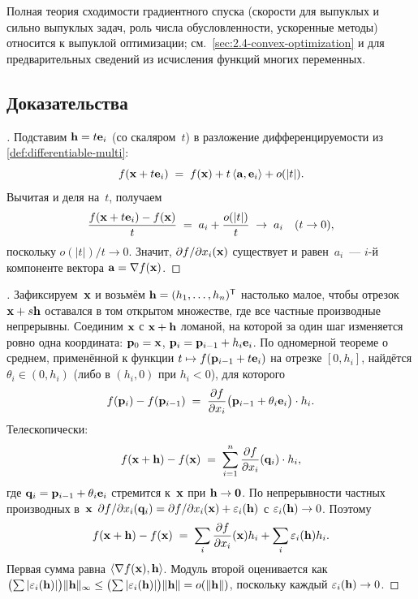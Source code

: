 \begin{remark}
Полная теория сходимости градиентного спуска (скорости для выпуклых и
сильно выпуклых задач, роль числа обусловленности, ускоренные методы)
относится к выпуклой оптимизации; см.\ \cref{sec:2.4-convex-optimization}
и \cite{Zorich1981} для предварительных сведений из исчисления
функций многих переменных.
\end{remark}

\subsection*{Доказательства}

\begin{proof}[]
Подставим $\mathbf{h} = t \mathbf{e}_i$ (со скаляром~$t$) в разложение
дифференцируемости из \cref{def:differentiable-multi}:
\[
  f(\mathbf{x} + t\mathbf{e}_i) \;=\; f(\mathbf{x}) + t\, \langle \mathbf{a}, \mathbf{e}_i \rangle + o(|t|).
\]
Вычитая и деля на~$t$, получаем
\[
  \frac{f(\mathbf{x} + t\mathbf{e}_i) - f(\mathbf{x})}{t} \;=\; a_i + \frac{o(|t|)}{t} \;\to\; a_i \quad (t \to 0),
\]
поскольку $o(|t|)/t \to 0$. Значит, $\partial f / \partial x_i (\mathbf{x})$
существует и равен~$a_i$~--- $i$-й компоненте вектора
$\mathbf{a} = \nabla f(\mathbf{x})$.
\end{proof}

\begin{proof}[]
Зафиксируем~$\mathbf{x}$ и возьмём $\mathbf{h} = (h_1, \dots, h_n)^{\mathsf{T}}$
настолько малое, чтобы отрезок $\mathbf{x} + s\mathbf{h}$ оставался в том
открытом множестве, где все частные производные непрерывны. Соединим
$\mathbf{x}$ с $\mathbf{x} + \mathbf{h}$ ломаной, на которой за один шаг
изменяется ровно одна координата:
$\mathbf{p}_0 = \mathbf{x}$, $\mathbf{p}_i = \mathbf{p}_{i-1} + h_i \mathbf{e}_i$.
По одномерной теореме о среднем, применённой к функции
$t \mapsto f(\mathbf{p}_{i-1} + t \mathbf{e}_i)$ на отрезке $[0, h_i]$,
найдётся $\theta_i \in (0, h_i)$ (либо в $(h_i, 0)$ при $h_i < 0$),
для которого
\[
  f(\mathbf{p}_i) - f(\mathbf{p}_{i-1}) \;=\; \frac{\partial f}{\partial x_i}\bigl(\mathbf{p}_{i-1} + \theta_i \mathbf{e}_i\bigr) \cdot h_i.
\]
Телескопически:
\[
  f(\mathbf{x} + \mathbf{h}) - f(\mathbf{x}) \;=\; \sum_{i=1}^{n} \frac{\partial f}{\partial x_i}(\mathbf{q}_i) \cdot h_i,
\]
где $\mathbf{q}_i = \mathbf{p}_{i-1} + \theta_i \mathbf{e}_i$ стремится
к~$\mathbf{x}$ при $\mathbf{h} \to \mathbf{0}$. По непрерывности частных
производных в~$\mathbf{x}$
$\partial f / \partial x_i(\mathbf{q}_i) = \partial f / \partial x_i(\mathbf{x}) + \varepsilon_i(\mathbf{h})$
с $\varepsilon_i(\mathbf{h}) \to 0$. Поэтому
\[
  f(\mathbf{x} + \mathbf{h}) - f(\mathbf{x}) \;=\; \sum_i \frac{\partial f}{\partial x_i}(\mathbf{x}) h_i + \sum_i \varepsilon_i(\mathbf{h}) h_i.
\]
Первая сумма равна $\langle \nabla f(\mathbf{x}), \mathbf{h} \rangle$.
Модуль второй оценивается как
$\bigl(\sum |\varepsilon_i(\mathbf{h})|\bigr) \|\mathbf{h}\|_\infty \le \bigl(\sum |\varepsilon_i(\mathbf{h})|\bigr) \|\mathbf{h}\| = o(\|\mathbf{h}\|)$,
поскольку каждый $\varepsilon_i(\mathbf{h}) \to 0$.
\end{proof}

